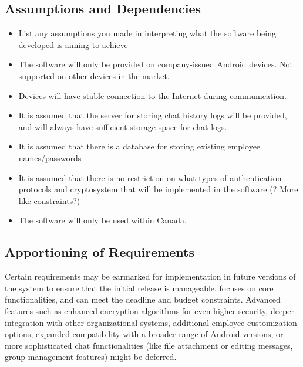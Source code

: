 \documentclass[]{article}
\begin{document}

\subsection{Assumptions and Dependencies}
\label{sub:assumptions_and_dependencies}
\begin{itemize}
	\item List any assumptions you made in interpreting what the software being developed is aiming to achieve
	\item The software will only be provided on company-issued Android devices. Not supported on other devices in the market.
    \item Devices will have stable connection to the Internet during communication. 
    \item It is assumed that the server for storing chat history logs will be provided, and will always have sufficient storage space for chat logs. 
    \item It is assumed that there is a database for storing existing employee names/passwords
    \item It is assumed that there is no restriction on what types of authentication protocols and cryptosystem that will be implemented in the software (? More like constraints?)
    \item The software will only be used within Canada.

\end{itemize}

\subsection{Apportioning of Requirements}
\label{sub:apportioning_of_requirements}
\hspace{5mm}Certain requirements may be earmarked for implementation in future versions of the system to ensure that the initial release is manageable, focuses on core functionalities, and can meet the deadline and budget constraints. Advanced features such as enhanced encryption algorithms for even higher security, deeper integration with other organizational systems, additional employee customization options, expanded compatibility with a broader range of Android versions, or more sophisticated chat functionalities (like file attachment or editing messages, group management features) might be deferred. 

\end{document}
